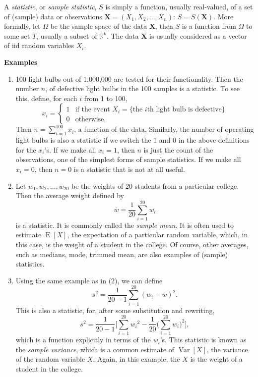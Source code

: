 \documentclass[12pt]{article}
\begin{document}
A \emph{statistic}, or \emph{sample statistic}, $S$ is simply a function, usually real-valued, of a set of (sample) data or observations $\boldsymbol{X}=(X_1,X_2,\ldots,X_n)$: $S=S(\boldsymbol{X})$.  More formally, let $\Omega$ be the sample space of the data $\boldsymbol{X}$, then $S$ is a function from $\Omega$ to some set $T$, usually a subset of $\mathbb{R}^k$.  The data $\boldsymbol{X}$ is usually considered as a vector of iid random variables $X_i$.
\par
\textbf{Examples}
\begin{enumerate}
\item 100 light bulbs out of 1,000,000 are tested for their functionality.  Then the number $n$, of defective light bulbs in the 100 samples is a statistic.  To see this, define, for each $i$ from 1 to 100, 
$$
x_i = 
\begin{cases}
1 & \text{if the event }X_i=\lbrace \text{the }i\text{th light bulb is defective}\rbrace \\
0 & \text{otherwise.}
\end{cases}
$$
Then $n=\sum_{i=1}^{100} x_i$, a function of the data.  Similarly, the number of operating light bulbs is also a statistic if we switch the 1 and 0 in the above definitions for the $x_i$'s.  If we make all $x_i=1$, then $n$ is just the 
count of the observations, one of the simplest forms of sample statistics.  If we make all $x_i=0$, then $n=0$ is a statistic that is not at all useful.
\item Let $w_1,w_2,\ldots,w_{20}$ be the weights of 20 students from a particular college.  Then the average weight defined by 
$$\overline{w}=\frac{1}{20}\sum_{i=1}^{20}w_i$$
is a statistic.  It is commonly called the \emph{sample mean}.  It is often used to estimate $\operatorname{E}[X]$, the expectation of a particular random variable, which, in this case, is the weight of a student in the college.  Of course, other averages, such as medians, mode, trimmed mean, are also examples of (sample) statistics.
\item Using the same example as in (2), we can define 
$$s^2=\frac{1}{20-1}\sum_{i=1}^{20}(w_i-\overline{w})^2.$$
This is also a statistic, for, after some substitution and rewriting, 
$$s^2=\frac{1}{20-1}\Big[\sum_{i=1}^{20}{w_i}^2-\frac{1}{20}(\sum_{i=1}^{20}{w_i)}^2\Big],$$
which is a function explicitly in terms of the $w_i$'s.  This statistic is known as the \emph{sample variance}, which is a common estimate of $\operatorname{Var}[X]$, the variance of the random variable $X$.  Again, in this example, the $X$ is the weight of a student in the college.

\end{enumerate}
\end{document}
